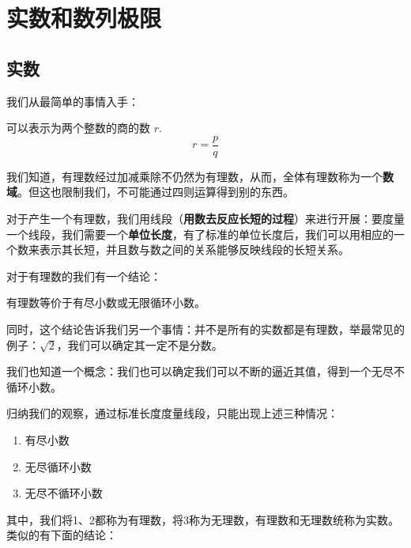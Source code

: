 \chapter{实数和数列极限}

\section{实数}

我们从最简单的事情入手：

\begin{definition}[有理数]
  可以表示为两个整数的商的数 $r$.
  \[r=\frac{p}{q}\]
\end{definition}

我们知道，有理数经过加减乘除不仍然为有理数，从而，全体有理数称为一个\textbf{数域}。但这也限制我们，不可能通过四则运算得到别的东西。

对于产生一个有理数，我们用线段（\textbf{用数去反应长短的过程}）来进行开展：要度量一个线段，我们需要一个\textbf{单位长度}，有了标准的单位长度后，我们可以用相应的一个数来表示其长短，并且数与数之间的关系能够反映线段的长短关系。

对于有理数的我们有一个结论：

\begin{theorem}
  有理数等价于有尽小数或无限循环小数。
\end{theorem}

同时，这个结论告诉我们另一个事情：并不是所有的实数都是有理数，举最常见的例子：\(\sqrt{2}\)，我们可以确定其一定不是分数。



我们也知道一个概念：我们也可以确定我们可以不断的逼近其值，得到一个无尽不循环小数。

归纳我们的观察，通过标准长度度量线段，只能出现上述三种情况：

\begin{enumerate}
\def\labelenumi{\arabic{enumi}.}
\item
  有尽小数
\item
  无尽循环小数
\item
  无尽不循环小数
\end{enumerate}


其中，我们将1、2都称为有理数，将3称为无理数，有理数和无理数统称为实数。类似的有下面的结论：

